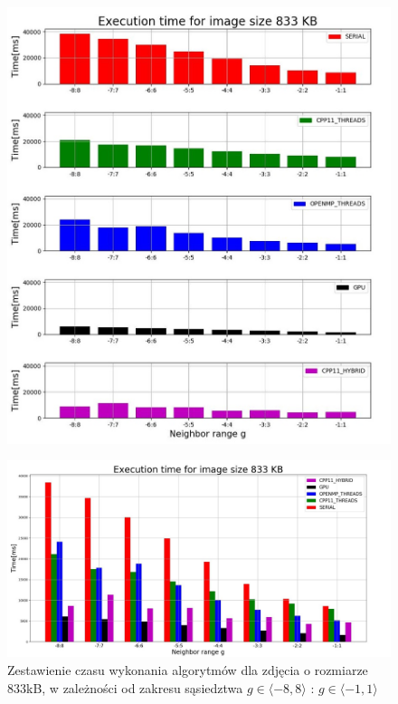 \documentclass[document.tex]{subfiles}
\begin{document}
\clearpage
\begin{figure}[h]
\includegraphics[scale=0.6]{imgs/plot6_lap.jpg}
\caption*{}
\label{fig:results_lap_hybrid}
\end{figure}
\clearpage
\begin{figure}[h]
\includegraphics[scale=0.35]{imgs/plot3_lap.jpg}
\caption{Zestawienie czasu wykonania algorytmów dla zdjęcia o rozmiarze 833kB, 
        w zależności od zakresu sąsiedztwa $g\in \langle -8, 8 \rangle$ : $g\in \langle -1, 1 \rangle$ }
\label{fig:results_lap_hybrid}
\end{figure}
\end{document}
